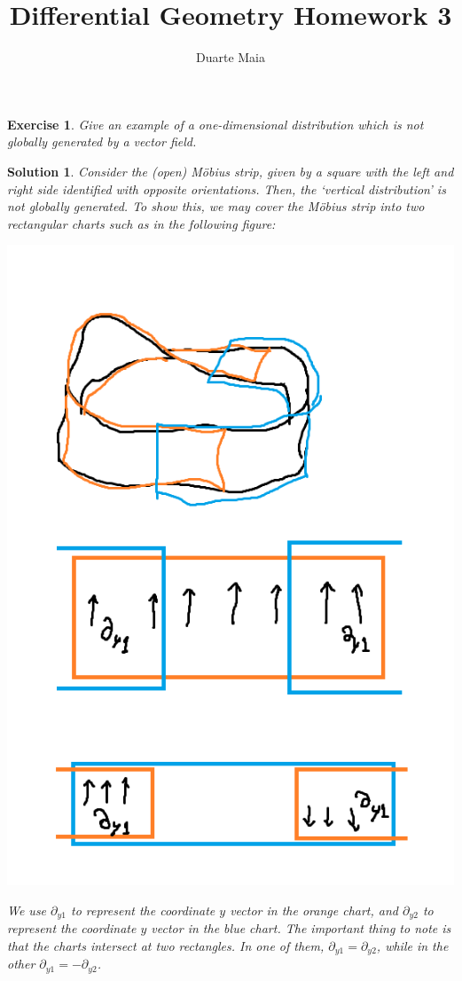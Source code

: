 \documentclass{article}
\title{Differential Geometry Homework 3}
\author{Duarte Maia}
\date{}
\newtheorem{ex}{Exercise}
\theoremstyle{nonumberplain}
\newtheorem{sol}{Solution}
\begin{document}
\maketitle

\begin{ex}
Give an example of a one-dimensional distribution which is not globally generated by a vector field.
\end{ex}

\begin{sol}
Consider the (open) Möbius strip, given by a square with the left and right side identified with opposite orientations. Then, the `vertical distribution' is not globally generated. To show this, we may cover the Möbius strip into two rectangular charts such as in the following figure:

\begin{center}
\includegraphics[width=.7\linewidth]{mobcharts}
\end{center}

We use $\partial_{y1}$ to represent the coordinate $y$ vector in the orange chart, and $\partial_{y2}$ to represent the coordinate $y$ vector in the blue chart. The important thing to note is that the charts intersect at two rectangles. In one of them, $\partial_{y1} = \partial_{y2}$, while in the other $\partial_{y1} = - \partial_{y2}$.


\end{sol}
\end{document}
